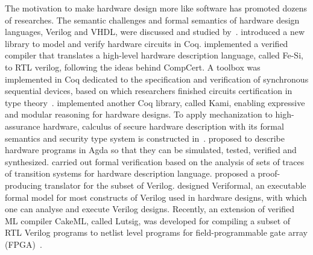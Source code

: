 The motivation to make hardware design more like software has promoted dozens of researches.
The semantic challenges and formal semantics of hardware design languages, Verilog and VHDL, were discussed and studied by~\cite{Gordon95,Kloos1995FormalSF}.
\cite{Braibant11} introduced a new library to model and verify hardware circuits in Coq.
\cite{Braibant13} implemented a verified compiler that translates a high-level hardware description language, called Fe-Si, to RTL verilog,
following the ideas behind CompCert.
A toolbox was implemented in Coq dedicated to the specification and verification of synchronous sequential devices, based on which researchers finished circuits certification in type theory~\cite{Coupet04}.
\cite{ChoiACM17} implemented another Coq library, called Kami, enabling expressive and modular reasoning for hardware designs.
To apply mechanization to high-assurance hardware, calculus of secure hardware description with its formal semantics and security type system is constructed in~\cite{Reynolds19}.
\cite{FlorSS15} proposed to describe  hardware programs in Agda so that they can be simulated, tested, verified and synthesized.
\cite{Gordon02} carried out formal verification based on the analysis of sets of traces of transition systems for hardware description language.
\cite{Loow19} proposed a proof-producing translator for the subset of Verilog.
\cite{Khan17} designed Veriformal, an executable formal model for most constructs of Verilog used in hardware designs,
with which one can analyse and execute Verilog designs.
Recently, an extension of verified ML compiler CakeML, called Lutsig, was developed for compiling  a subset of RTL Verilog programs to netlist level programs for field-programmable gate array (FPGA)~\cite{Loow21,loowphd21}. 



